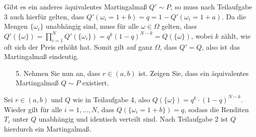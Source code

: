 \documentclass{article}
\begin{document}
Gibt es ein anderes äquivalentes Martingalmaß $Q'\sim P$, so muss nach Teil\-auf\-ga\-be 3 auch hierfür gelten, dass $Q'(\omega_i=1+b)=q=1-Q'(\omega_i=1+a)$.
Da die Mengen $\{\omega_i\}$ unabhängig sind, muss für alle $\omega\in\Omega$ gelten, dass $Q'(\{\omega\})=\prod_{i=1}^NQ'(\{\omega_i\})=q^k(1-q)^{N-k}=Q(\{\omega\})$, wobei $k$ zählt, wie oft sich der Preis erhöht hat.
Somit gilt auf ganz $\Omega$, dass $Q'=Q$, also ist das Martingalmaß eindeutig.
\begin{itemize}
\item [5.] Nehmen Sie nun an, dass $r\in(a,b)$ ist.
  Zeigen Sie, dass ein äquivalentes Martingalmaß $Q\sim P$ existiert.
\end{itemize}
Sei $r\in(a,b)$ und $Q$ wie in Teilaufgabe 4, also $Q(\{\omega\})=q^k\cdot (1-q)^{N-k}$.
Wieder gilt für alle $i=1,\dots,N$, dass $Q(\{\omega_i=1+b\})=q$, sodass die Renditen $T_i$ unter $Q$ unabhängig und identisch verteilt sind.
Nach Teilaufgabe 2 ist $Q$ hierdurch ein Martingalmaß.

\end{document}
